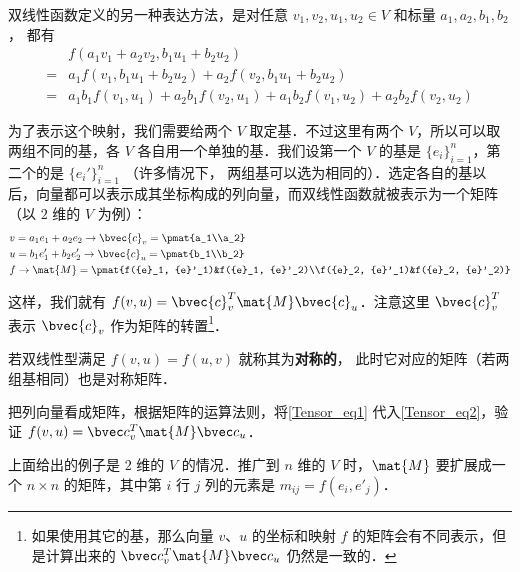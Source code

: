 双线性函数定义的另一种表达方法，是对任意 $v_1, v_2, u_1, u_2\in V$ 和标量 $a_1,a_2,b_1,b_2$， 都有
\begin{equation}\label{Tensor_eq2}
\begin{aligned}
 &f(a_1{v}_1+a_2{v}_2, b_1{u}_1+b_2{u}_2)\\
={}&a_1f({v}_1, b_1{u}_1+b_2{u}_2)+a_2f({v}_2, b_1{u}_1+b_2{u}_2)\\
={}&a_1b_1f({v}_1, {u}_1)+a_2b_1f({v}_2, {u}_1)+a_1b_2f({v}_1, {u}_2)+a_2b_2f({v}_2, {u}_2)
\end{aligned}
\end{equation}

为了表示这个映射，我们需要给两个 $V$ 取定基．不过这里有两个 $V$，所以可以取两组不同的基，各 $V$ 各自用一个单独的基．我们设第一个 $V$ 的基是 $\{{e}_i\}^n_{i=1}$，第二个的是 $\{{e}_i'\}^n_{i=1}$ （许多情况下， 两组基可以选为相同的）．选定各自的基以后，向量都可以表示成其坐标构成的列向量，而双线性函数就被表示为一个矩阵（以 $2$ 维的 $V$ 为例）：
\begin{equation}\label{Tensor_eq1}
\begin{aligned}
&{v}=a_1{e}_1+a_2{e}_2\rightarrow   \bvec{c}_v =\pmat{a_1\\a_2}\\
&{u}=b_1{e}'_1+b_2{e}'_2\rightarrow  \bvec{c}_u =\pmat{b_1\\b_2}\\
&f\rightarrow \mat{M}=\pmat{f({e}_1, {e}'_1)&f({e}_1, {e}'_2)\\f({e}_2, {e}'_1)&f({e}_2, {e}'_2)}\\
\end{aligned}
\end{equation}

这样，我们就有 $f({v}, {u})=  \bvec{c}_v^T \mat{M} \bvec{c}_u$．注意这里 $\bvec{c}_v^T$ 表示 $ \bvec{c}_v$ 作为矩阵的转置\footnote{如果使用其它的基，那么向量 ${v}$、${u}$ 的坐标和映射 $f$ 的矩阵会有不同表示，但是计算出来的 $ \bvec c_v^T\mat{M}  \bvec c_u$ 仍然是一致的．}．

若双线性型满足 $f(v, u) = f(u, v)$ 就称其为\textbf{对称的}， 此时它对应的矩阵（若两组基相同）也是对称矩阵．

\begin{exercise}{}\label{Tensor_exe1}
把列向量看成矩阵，根据矩阵的运算法则，将\autoref{Tensor_eq1} 代入\autoref{Tensor_eq2}，验证 $f({v}, {u})=  \bvec c_v^T\mat{M}  \bvec c_u$．
\end{exercise}

上面给出的例子是 $2$ 维的 $V$ 的情况．推广到 $n$ 维的 $V$ 时，$\mat{M}$ 要扩展成一个 $n\times n$ 的矩阵，其中第 $i$ 行 $j$ 列的元素是 $m_{ij}=f({e}_i, {e}'_j)$．

